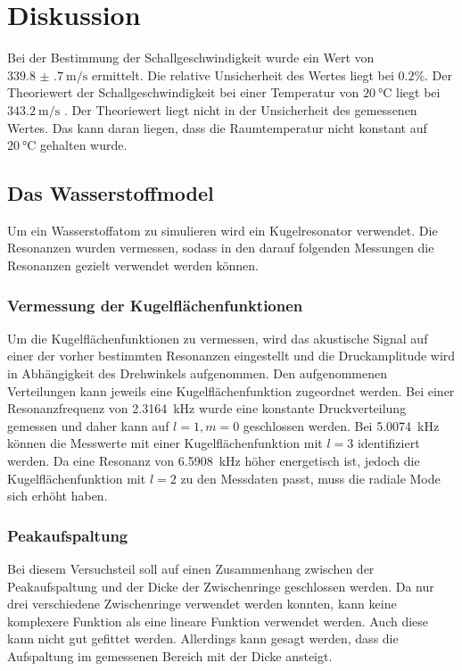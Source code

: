 \section{Diskussion}
\label{sec:Diskussion}
Bei der Bestimmung der Schallgeschwindigkeit wurde ein Wert von $\SI{339.8(7)}{\meter\per\second}$ ermittelt. 
Die relative Unsicherheit des Wertes liegt bei $\num{0.2}$\%. Der Theoriewert der Schallgeschwindigkeit bei einer Temperatur von
$\SI{20}{\celsius}$ liegt bei $\SI{343.2}{\meter\per\second}$ \cite{Schallgeschwindigkeit}. Der Theoriewert liegt nicht in der Unsicherheit des 
gemessenen Wertes. Das kann daran liegen, dass die Raumtemperatur nicht konstant auf $\SI{20}{\celsius}$ gehalten wurde.

\subsection{Das Wasserstoffmodel}
Um ein Wasserstoffatom zu simulieren wird ein Kugelresonator verwendet. Die Resonanzen wurden vermessen, sodass in den darauf 
folgenden Messungen die Resonanzen gezielt verwendet werden können.
\subsubsection{Vermessung der Kugelflächenfunktionen}
Um die Kugelflächenfunktionen zu vermessen, wird das akustische Signal auf einer der vorher bestimmten Resonanzen eingestellt 
und die Druckamplitude wird in Abhängigkeit des Drehwinkels aufgenommen.
Den aufgenommenen Verteilungen kann jeweils eine Kugelflächenfunktion zugeordnet werden. Bei einer Resonanzfrequenz von 
\SI{2.3164}{\kilo\hertz} wurde eine konstante Druckverteilung gemessen und daher kann auf $l=1,m=0$ geschlossen werden.
Bei \SI{5.0074}{\kilo\hertz} können die Messwerte mit einer Kugelflächenfunktion mit $l=3$ identifiziert werden.
Da eine Resonanz von \SI{6.5908}{\kilo\hertz} höher energetisch ist, jedoch die Kugelflächenfunktion mit $l=2$ zu den Messdaten
passt, muss die radiale Mode sich erhöht haben.
\subsubsection{Peakaufspaltung}
Bei diesem Versuchsteil soll auf einen Zusammenhang zwischen der Peakaufspaltung und der Dicke der Zwischenringe geschlossen werden.
Da nur drei verschiedene Zwischenringe verwendet werden konnten, kann keine komplexere Funktion als eine lineare Funktion 
verwendet werden. Auch diese kann nicht gut gefittet werden. Allerdings kann gesagt werden, dass die Aufspaltung im gemessenen Bereich
mit der Dicke ansteigt. 

